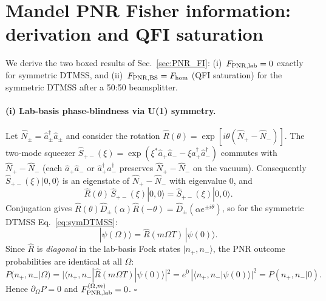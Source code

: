 \documentclass[11pt]{article}
\begin{document}
\section{Mandel PNR Fisher information: derivation and QFI saturation}
\label{app:PNR_FI}

We derive the two boxed results of Sec.~\ref{sec:PNR_FI}:
(i)~$F_{\rm PNR,lab}=0$ exactly for symmetric DTMSS, and
(ii)~$F_{\rm PNR,BS}=F_{\rm hom}$ (QFI saturation) for the
symmetric DTMSS after a 50:50 beamsplitter.

\paragraph{(i) Lab-basis phase-blindness via U(1) symmetry.}
Let $\hat N_\pm = \hat a_\pm^\dag\hat a_\pm$ and consider the
rotation $\hat R(\theta) = \exp[i\theta(\hat N_+ - \hat N_-)]$.
The two-mode squeezer
$\hat S_{+-}(\xi) = \exp(\xi^*\hat a_+\hat a_- - \xi\hat a_+^\dag
\hat a_-^\dag)$ commutes with $\hat N_+ - \hat N_-$ (each
$\hat a_+\hat a_-$ or $\hat a_+^\dag\hat a_-^\dag$ preserves
$\hat N_+ - \hat N_-$ on the vacuum).  Consequently
$\hat S_{+-}(\xi)|0,0\rangle$ is an eigenstate of $\hat N_+-\hat N_-$
with eigenvalue $0$, and
\begin{equation}
  \hat R(\theta)\,\hat S_{+-}(\xi)|0,0\rangle
  = \hat S_{+-}(\xi)|0,0\rangle.
\end{equation}
Conjugation gives
$\hat R(\theta)\hat D_\pm(\alpha)\hat R(-\theta)
= \hat D_\pm(\alpha e^{\pm i\theta})$, so for the symmetric DTMSS
Eq.~\eqref{eq:symDTMSS}:
\begin{equation}
  |\psi(\Omega)\rangle
  = \hat R(m\Omega T)\,|\psi(0)\rangle.
\end{equation}
Since $\hat R$ is \emph{diagonal} in the lab-basis Fock states
$|n_+,n_-\rangle$, the PNR outcome probabilities are identical at
all $\Omega$:
\begin{equation}
  P(n_+,n_-|\Omega)
  = |\langle n_+,n_-|\hat R(m\Omega T)|\psi(0)\rangle|^2
  = e^{0}\,|\langle n_+,n_-|\psi(0)\rangle|^2 = P(n_+,n_-|0).
\end{equation}
Hence $\partial_\Omega P = 0$ and
$F_{\rm PNR,lab}^{(\Omega,m)} = 0$.  \hfill$\square$
\end{document}

